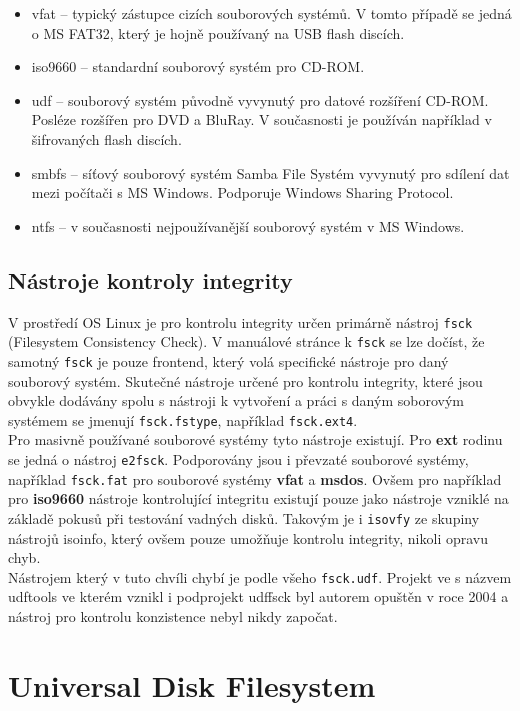\begin{itemize}
    \item vfat -- typický zástupce cizích souborových systémů. V tomto případě se jedná o MS FAT32, který je hojně používaný na USB flash discích.
    \item iso9660 -- standardní souborový systém pro CD-ROM. 
    \item udf -- souborový systém původně vyvynutý pro datové rozšíření CD-ROM. Posléze rozšířen pro DVD a BluRay. V současnosti je používán například v šifrovaných flash discích. 
    \item smbfs -- síťový souborový systém Samba File Systém vyvynutý pro sdílení dat mezi počítači s MS Windows. Podporuje Windows Sharing Protocol.
    \item ntfs -- v současnosti nejpoužívanější souborový systém v MS Windows.
\end{itemize}

\section{Nástroje kontroly integrity}
V prostředí OS Linux je pro kontrolu integrity určen primárně nástroj \texttt{fsck} (Filesystem Consistency Check). V manuálové stránce k \texttt{fsck} \cite{man-fsck} se lze dočíst, že samotný \texttt{fsck} je pouze frontend, který volá specifické nástroje pro daný souborový systém. Skutečné nástroje určené pro kontrolu integrity, které jsou obvykle dodávány spolu s nástroji k vytvoření a práci s daným soborovým systémem se jmenují \texttt{fsck.fstype}, například \texttt{fsck.ext4}.\\
Pro masivně používané souborové systémy tyto nástroje existují. Pro \textbf{ext} rodinu se jedná o nástroj \texttt{e2fsck}. Podporovány jsou i převzaté souborové systémy, například \texttt{fsck.fat} pro souborové systémy \textbf{vfat} a \textbf{msdos}. Ovšem pro například pro \textbf{iso9660} nástroje kontrolující integritu existují pouze jako nástroje vzniklé na základě pokusů při testování vadných disků. Takovým je i \texttt{isovfy} \cite{man-isovfy} ze skupiny nástrojů isoinfo, který ovšem pouze umožňuje kontrolu integrity, nikoli opravu chyb.\\
Nástrojem který v tuto chvíli chybí je podle všeho \texttt{fsck.udf}. Projekt ve s názvem udftools \cite{udftool-sourceforge} ve kterém vznikl i podprojekt udffsck byl autorem opuštěn v roce 2004 a nástroj pro kontrolu konzistence nebyl nikdy započat. 

\chapter{Universal Disk Filesystem}

